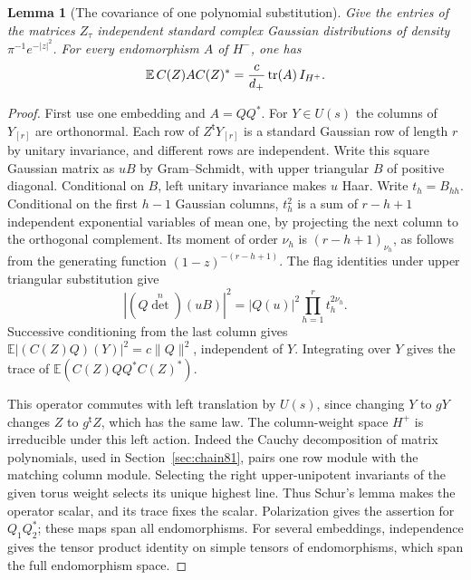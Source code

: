 \documentclass[a4paper,11pt]{article}
\newtheorem{lemma}[proposition]{Lemma}
\theoremstyle{definition}
\theoremstyle{remark}
\numberwithin{equation}{section}
\begin{document}
\begin{lemma}[The covariance of one polynomial substitution]\leavevmode
\label{lem:framecov509}
Give the entries of the matrices \(Z_\tau\) independent standard
complex Gaussian distributions of density \(\pi^{-1}e^{-|z|^2}\).
For every endomorphism \(A\) of \(H^-\), one has
\[
           \mathbb E\, C(Z)A C(Z)^*
                     ={c\over d_+}\operatorname{tr}(A)\,I_{H^+}.
\]
\end{lemma}
\begin{proof}
First use one embedding and \(A=QQ^*\). For \(Y\in U(s)\)
the columns of \(Y_{[r]}\) are orthonormal. Each row of
\(Z^{\mathsf t}Y_{[r]}\) is a standard Gaussian row of length \(r\)
by unitary invariance, and different rows are independent. Write
this square Gaussian matrix as \(uB\) by Gram--Schmidt, with
upper triangular \(B\) of positive diagonal. Conditional on
\(B\), left unitary invariance makes \(u\) Haar. Write \(t_h=B_{hh}\).
Conditional on the first \(h-1\) Gaussian columns, \(t_h^2\)
is a sum of \(r-h+1\) independent exponential variables of mean
one, by projecting the next column to the orthogonal complement.
Its moment of order \(\nu_h\) is \((r-h+1)_{\nu_h}\), as follows
from the generating function \((1-z)^{-(r-h+1)}\).
The flag identities under upper triangular substitution give
\[
          |(Q\det^n)(uB)|^2
                    =|Q(u)|^2\prod_{h=1}^r t_h^{2\nu_h}.
\]
Successive conditioning from the last column gives
\(\mathbb E |(C(Z)Q)(Y)|^2=c\|Q\|^2\), independent of \(Y\).
Integrating over \(Y\) gives the trace of
\(\mathbb E(C(Z)QQ^*C(Z)^*)\).

This operator commutes with left translation by \(U(s)\), since
changing \(Y\) to \(gY\) changes \(Z\) to \(g^{\mathsf t}Z\),
which has the same law. The column-weight space \(H^+\) is
irreducible under this left action. Indeed the Cauchy
decomposition of matrix polynomials, used in
Section~\ref{sec:chain81}, pairs one row module with the matching
column module. Selecting the right upper-unipotent invariants of
the given torus weight selects its unique highest line. Thus
Schur's lemma makes the operator scalar, and its trace fixes the
scalar. Polarization gives the assertion for \(Q_1Q_2^*\);
these maps span all endomorphisms. For several embeddings,
independence gives the tensor product identity on simple tensors
of endomorphisms, which span the full endomorphism space.
\end{proof}
\end{document}
